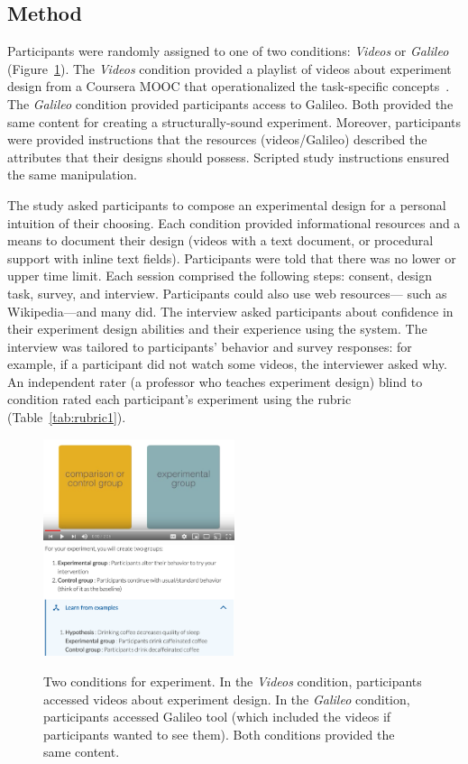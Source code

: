 \subsection*{Method}
Participants were randomly assigned to one of two conditions: \textit{Videos} or \textit{Galileo} (Figure~\ref{fig:galileo-study}). The \textit{Videos} condition provided a playlist of videos about experiment design from a Coursera MOOC that operationalized the task-specific concepts~\cite{Wobbrock2018}. The \textit{Galileo} condition provided participants access to Galileo. Both provided the same content for creating a structurally-sound experiment. Moreover, participants were provided instructions that the resources (videos/Galileo) described the attributes that their designs should possess. Scripted study instructions ensured the same manipulation. 

The study asked participants to compose an experimental design for a personal intuition of their choosing. Each condition provided informational resources and a means to document their design (videos with a text document, or procedural support with inline text fields). Participants were told that there was no lower or upper time limit. Each session comprised the following steps: consent, design task, survey, and interview. Participants could also use web resources--- such as Wikipedia---and many did. The interview asked participants about confidence in their experiment design abilities and their experience using the system. The interview was tailored to participants' behavior and survey responses: for example, if a participant did not watch some videos, the interviewer asked why. An independent rater (a professor who teaches experiment design) blind to condition rated each participant's experiment using the rubric (Table~\ref{tab:rubric1}).

\begin{figure}[t] 
  \includegraphics[width=0.5\textwidth]{figures/galileo/galileo-study-1}
  \includegraphics[width=0.5\textwidth]{figures/galileo/galileo-study-2}
  \caption[Two conditions for experiment: \textit{Videos} and \textit{Galileo}]
{Two conditions for experiment. In the \textit{Videos} condition, participants accessed videos about experiment design. In the \textit{Galileo} condition, participants accessed Galileo tool (which included the videos if participants wanted to see them). Both conditions provided the same content. }
  \label{fig:galileo-study}
\end{figure}


